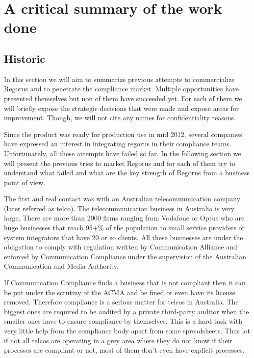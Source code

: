 \documentclass[10pt]{report}
\begin{document}
\section{A critical summary of the work done}

\subsection{Historic}
In this section we will aim to summarize previous attempts to commercialize Regorus and to penetrate the compliance market. Multiple opportunities have presented themselves but non of them have succeeded yet. For each of them we will briefly expose the strategic decisions that were made and expose areas for improvement. Though, we will not cite any names for confidentiality reasons.

Since the product was ready for production use in mid 2012, several companies have expressed an interest in integrating regorus in their compliance teams. Unfortunately, all these attempts have failed so far. In the following section we will present the previous tries to market Regorus and for each of them try to understand what failed and what are the key strength of Regorus from a business point of view.

The first and real contact was with an Australian telecommunication company (later referred as telco). The telecommunication business in Australia is very large. There are more than 2000 firms ranging from Vodafone or Optus who are huge businesses that reach 95+\% of the population to small service providers or system integrators that have 20 or so clients. All these businesses are under the obligation to comply with regulation written by Communication Alliance and enforced by Communication Compliance under the supervision of the Australian Communication and Media Authority.

If Communication Compliance finds a business that is not compliant then it can be put under the scrutiny of the ACMA and be fined or even have its license removed. Therefore compliance is a serious matter for telcos in Australia. The biggest ones are required to be audited by a private third-party auditor when the smaller ones have to ensure compliance by themselves. This is a hard task with very little help from the compliance body apart from some spreadsheets. Thus lot if not all telcos are operating in a grey area where they do not know if their processes are compliant or not, most of them don't even have explicit processes.
\end{document}
